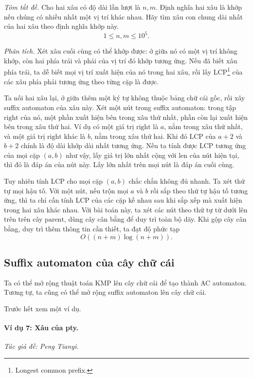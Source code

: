 \documentclass[11pt]{article}
\begin{document}
\emph{Tóm tắt đề.}
Cho hai xâu có độ dài lần lượt là \(n,m\). Định nghĩa hai xâu là khớp nếu chúng
có nhiều nhất một vị trí khác nhau. Hãy tìm xâu con chung dài nhất của hai xâu
theo định nghĩa khớp này.
\[
  1\le n,m\le 10^5.
\]

\emph{Phân tích.}
Xét xâu cuối cùng có thể khớp được: ở giữa nó có một vị trí không khớp, còn hai
phía trái và phải của vị trí đó khớp tương ứng. Nếu đã biết xâu phía trái, ta
dễ biết mọi vị trí xuất hiện của nó trong hai xâu, rồi lấy LCP\footnote{Longest
common prefix.} của các xâu phía phải tương ứng theo từng cặp là được.

Ta nối hai xâu lại, ở giữa thêm một ký tự không thuộc bảng chữ cái gốc, rồi xây
suffix automaton của xâu này. Xét một nút trong suffix automaton: trong tập
\(\mathrm{right}\) của nó, một phần xuất hiện bên trong xâu thứ nhất, phần còn
lại xuất hiện bên trong xâu thứ hai. Ví dụ có một giá trị \(\mathrm{right}\)
là \(a\), nằm trong xâu thứ nhất, và một giá trị \(\mathrm{right}\) khác là
\(b\), nằm trong xâu thứ hai. Khi đó LCP của \(a+2\) và \(b+2\) chính là độ dài
khớp dài nhất tương ứng. Nếu ta tính được LCP tương ứng của mọi cặp \((a,b)\)
như vậy, lấy giá trị lớn nhất cộng với \(\mathrm{len}\) của nút hiện tại, thì
đó là đáp án của nút này. Lấy lớn nhất trên mọi nút là đáp án cuối cùng.

Tuy nhiên tính LCP cho mọi cặp \((a,b)\) chắc chắn không đủ nhanh. Ta xét thứ tự
mọi hậu tố. Với một nút, nếu trộn mọi \(a\) và \(b\) rồi sắp theo thứ tự hậu tố
tương ứng, thì ta chỉ cần tính LCP của các cặp kề nhau sau khi sắp xếp mà xuất
hiện trong hai xâu khác nhau. Với bài toán này, ta xét các nút theo thứ tự từ
dưới lên trên trên cây \(\mathrm{parent}\), dùng cây cân bằng để duy trì toàn
bộ dãy. Khi gộp cây cân bằng, duy trì thêm thông tin cần thiết, ta đạt độ phức
tạp
\[
  O((n+m)\log(n+m)).
\]

\subsection{Suffix automaton của cây chữ cái}

Ta có thể mở rộng thuật toán KMP lên cây chữ cái để tạo thành AC automaton.
Tương tự, ta cũng có thể mở rộng suffix automaton lên cây chữ cái.

Trước hết xem một ví dụ.

\paragraph{Ví dụ 7: Xâu của pty.}
\emph{Tác giả đề: Peng Tianyi.}
\end{document}
